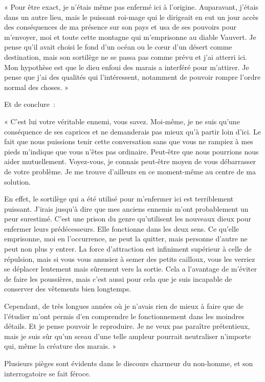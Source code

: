 \documentclass{report}
\begin{document}
« Pour être exact, je n'étais même pas enfermé ici à l'origine. Auparavant, j'étais dans un autre lieu, mais le puissant roi-mage qui le dirigeait en eut un jour accès des conséquences de ma présence sur son pays et usa de ses pouvoirs pour m'envoyer, moi et toute cette montagne qui m'emprisonne au diable Vauvert. Je pense qu'il avait choisi le fond d'un océan ou le cœur d'un désert comme destination, mais son sortilège ne se passa pas comme prévu et j'ai atterri ici. Mon hypothèse est que le dieu enfoui des marais a interféré pour m'attirer. Je pense que j'ai des qualités qui l'intéressent, notamment de pouvoir rompre l'ordre normal des choses. »

Et de conclure :

« C'est lui votre véritable ennemi, vous savez. Moi-même, je ne suis qu'une conséquence de ses caprices et ne demanderais pas mieux qu'à partir loin d'ici. Le fait que nous puissions tenir cette conversation sans que vous ne rampiez à mes pieds m'indique que vous n'êtes pas ordinaire. Peut-être que nous pourrions nous aider mutuellement. Voyez-vous, je connais peut-être moyen de vous débarrasser de votre problème. Je me trouve d'ailleurs en ce moment-même au centre de ma solution.

En effet, le sortilège qui a été utilisé pour m'enfermer ici est terriblement puissant. J'irais jusqu'à dire que mes anciens ennemis m'ont probablement un peur surestimé. C'est une prison du genre qu'utilisent les nouveaux dieux pour enfermer leurs prédécesseurs. Elle fonctionne dans les deux sens. Ce qu'elle emprisonne, moi en l’occurrence, ne peut la quitter, mais personne d'autre ne peut non plus y entrer. La force d'attraction est infiniment supérieur à celle de répulsion, mais si vous vous amusiez à semer des petits cailloux, vous les verriez se déplacer lentement mais sûrement vers la sortie. Cela a l'avantage de m'éviter de faire les poussières, mais c'est aussi pour cela que je suis incapable de conserver des vêtements bien longtemps.

Cependant, de très longues années où je n'avais rien de mieux à faire que de l'étudier m'ont permis d'en comprendre le fonctionnement dans les moindres détails. Et je pense pouvoir le reproduire. Je ne veux pas paraître prétentieux, mais je suis sûr qu'un sceau d'une telle ampleur pourrait neutraliser n'importe qui, même la créature des marais. »

Plusieurs pièges sont évidents dans le discours charmeur du non-homme, et son interrogatoire se fait féroce.
\end{document}
